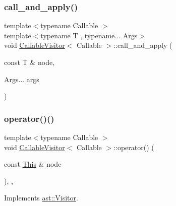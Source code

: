 \subsubsection{\texorpdfstring{call\+\_\+and\+\_\+apply()}{call\_and\_apply()}}
{\footnotesize\ttfamily template$<$typename Callable $>$ \\
template$<$typename T , typename... Args$>$ \\
void \hyperlink{struct_callable_visitor}{Callable\+Visitor}$<$ Callable $>$\+::call\+\_\+and\+\_\+apply (\begin{DoxyParamCaption}\item[{const T \&}]{node,  }\item[{Args...}]{args }\end{DoxyParamCaption})\hspace{0.3cm}{\ttfamily [inline]}}

\mbox{\label{struct_callable_visitor_ac435fdf6fcab885cf21f27364883c8ad}} 
\subsubsection{\texorpdfstring{operator()()}{operator()()}\hspace{0.1cm}{\footnotesize\ttfamily [1/43]}}
{\footnotesize\ttfamily template$<$typename Callable $>$ \\
void \hyperlink{struct_callable_visitor}{Callable\+Visitor}$<$ Callable $>$\+::operator() (\begin{DoxyParamCaption}\item[{const \hyperlink{structast_1_1_this}{This} \&}]{node }\end{DoxyParamCaption})\hspace{0.3cm}{\ttfamily [inline]}, {\ttfamily [override]}, {\ttfamily [virtual]}}



Implements \hyperlink{structast_1_1_visitor_a1a830145fdaf0d8fc5edf41e397edc9b}{ast\+::\+Visitor}.

\mbox{\label{struct_callable_visitor_a83e70f05edc12de1717db28d2cd11cd5}} 
